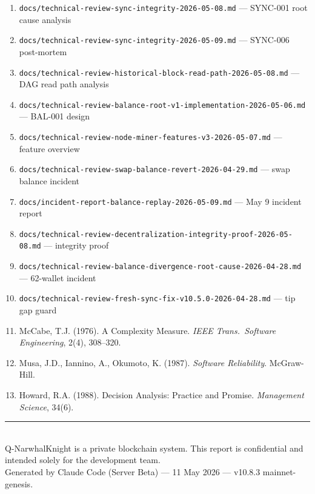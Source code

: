 \documentclass[12pt,a4paper]{article}
\begin{document}
\begin{enumerate}[leftmargin=*,itemsep=2pt]
\small
  \item \texttt{docs/technical-review-sync-integrity-2026-05-08.md} — SYNC-001 root cause analysis
  \item \texttt{docs/technical-review-sync-integrity-2026-05-09.md} — SYNC-006 post-mortem
  \item \texttt{docs/technical-review-historical-block-read-path-2026-05-08.md} — DAG read path analysis
  \item \texttt{docs/technical-review-balance-root-v1-implementation-2026-05-06.md} — BAL-001 design
  \item \texttt{docs/technical-review-node-miner-features-v3-2026-05-07.md} — feature overview
  \item \texttt{docs/technical-review-swap-balance-revert-2026-04-29.md} — swap balance incident
  \item \texttt{docs/incident-report-balance-replay-2026-05-09.md} — May 9 incident report
  \item \texttt{docs/technical-review-decentralization-integrity-proof-2026-05-08.md} — integrity proof
  \item \texttt{docs/technical-review-balance-divergence-root-cause-2026-04-28.md} — 62-wallet incident
  \item \texttt{docs/technical-review-fresh-sync-fix-v10.5.0-2026-04-28.md} — tip gap guard
  \item McCabe, T.J. (1976). A Complexity Measure. \emph{IEEE Trans.\ Software Engineering}, 2(4), 308--320.
  \item Musa, J.D., Iannino, A., Okumoto, K. (1987). \emph{Software Reliability}. McGraw-Hill.
  \item Howard, R.A. (1988). Decision Analysis: Practice and Promise. \emph{Management Science}, 34(6).
\end{enumerate}

\vfill
\begin{center}
\rule{0.5\linewidth}{0.4pt}\\[4pt]
\textcolor{qgray}{\small Q-NarwhalKnight is a private blockchain system.
This report is confidential and intended solely for the development team.\\
Generated by Claude Code (Server Beta) — 11 May 2026 — v10.8.3 mainnet-genesis.}
\end{center}
\end{document}
